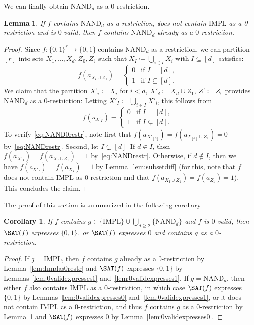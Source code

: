 \documentclass[10pt,a4paper]{article}
\theoremstyle{plain}
\newtheorem{lem}[thm]{Lemma}
\newtheorem{cor}[thm]{Corollary}
\newcommand{\NAND}{\mathrm{NAND}}
\newcommand{\Impl}{\mathrm{IMPL}}
\begin{document}
%
We can finally obtain $\NAND_d$ as a $0$-restriction.
%
%
\begin{lem}\label{lem:NANDas0restr}
If $f$ contains $\NAND_d$ as a restriction, does not contain $\Impl$ as a 0-restriction and is $0$-valid, then $f$ contains $\NAND_d$ already as a $0$-restriction.
\end{lem}
\begin{proof}
%
%
%
%
%
%
%
%
%
%
%
%
%
%
%
%
%
%
%
%
%
%
%
%
%
%
%
%
%
%
%
%
%
%
%
%
%
%
%
%
%
%
%
%
Since $f:\{0,1\}^r \to \{0,1\}$ contains $\NAND_d$ as a restriction, we can partition $[r]$ into sets $X_1,\dots,X_d,Z_0,Z_1$ such that $X_I\coloneqq \bigcup_{i\in I} X_i$ with $I\subseteq [d]$ satisfies:
\begin{equation}\label{eq:NANDrestr}
f(a_{X_I \cup Z_1}) = \begin{cases} 0 & \text{if } I = [d], \\ 1 & \text{if } I \subsetneq [d]. \end{cases}
\end{equation}
%
We claim that the partition $X'_{i} \coloneqq X_i$ for $i<d$, $X'_d \coloneqq X_d \cup Z_1$, $Z'\coloneqq Z_0$ provides $\NAND_d$ as a 0-restriction: Letting $X'_I \coloneqq \bigcup_{i\in I} X'_i$, this follows from
\begin{equation}\label{eq:NAND0restr}
f(a_{X'_I}) = \begin{cases} 0 & \text{if } I = [d], \\ 1 & \text{if } I \subsetneq [d]. \end{cases}
\end{equation}
To verify~\eqref{eq:NAND0restr}, note first that $f(a_{X'_{[d]}}) = f(a_{X_{[d]}\cup Z_1}) = 0$ by~\eqref{eq:NANDrestr}. Second, let $I\subsetneq [d]$. If $d\in I$, then $f(a_{X'_I}) = f(a_{X_I\cup Z_1}) = 1$ by~\eqref{eq:NANDrestr}. Otherwise, if $d\notin I$, then we have $f(a_{X'_I}) = f(a_{X_I}) = 1$ by Lemma~\ref{lem:subsetdiff} (for this, note that $f$ does not contain $\Impl$ as 0-restriction and that $f(a_{X_I \cup Z_1}) = f(a_{Z_1}) = 1$). This concludes the claim.   
\end{proof}
%
The proof of this section is summarized in the following corollary. 
%
\begin{cor}\label{cor:0validfmainclaim}
If $f$ contains $g\in \{\Impl\} \cup \bigcup_{d\ge 2} \{\NAND_d\}$ and $f$ is $0$-valid, then $\SAT(f)$ expresses $\{0,1\}$, or $\SAT(f)$ expresses $0$ and contains $g$ as a $0$-restriction. 
\end{cor}
\begin{proof}
If $g=\Impl$, then $f$ contains $g$ already as a $0$-restriction by Lemma~\ref{lem:Implas0restr} and $\SAT(f)$ expresses $\{0,1\}$ by Lemmas~\ref{lem:0validexpresses0} and~\ref{lem:0validexpresses1}.
%
If $g=\NAND_d$, then either $f$ also contains $\Impl$ as a $0$-restriction, in which case $\SAT(f)$ expresses $\{0,1\}$ by Lemmas~\ref{lem:0validexpresses0} and~\ref{lem:0validexpresses1}, or it does not contain $\Impl$ as a $0$-restriction, and thus $f$ contains $g$ as a $0$-restriction by Lemma~\ref{lem:NANDas0restr} and $\SAT(f)$ expresses $0$ by Lemma~\ref{lem:0validexpresses0}.
\end{proof}
%
%
%
\end{document}
